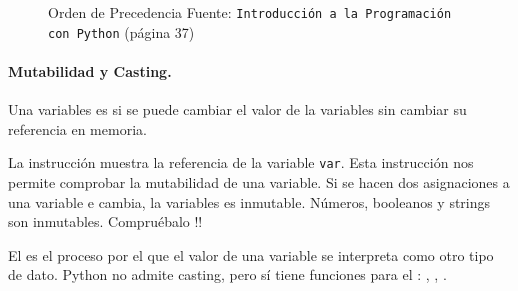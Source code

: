 \begin{figure}
\centerline{}

\caption{Orden de Precedencia \footnotesize Fuente: \texttt{Introducción a la Programación con Python} (página 37)}
\label{fig:precedencia}

\end{figure}


\paragraph{Mutabilidad y Casting.}

Una variables es  si se puede cambiar el valor de la variables sin cambiar su referencia en memoria.

La instrucción  muestra la referencia de la variable {\tt var}.
Esta instrucción nos permite comprobar la mutabilidad de una variable.
Si se hacen dos asignaciones a una variable e  cambia, la variables es inmutable.
Números, booleanos y strings son inmutables.  \hfill Compruébalo !!

	
	
El  es el proceso por el que el valor de una variable se interpreta como otro tipo de dato.
Python no admite casting, pero sí tiene funciones para el : 
	, , .





\label{subsec:ProgramacionEstructurada}

